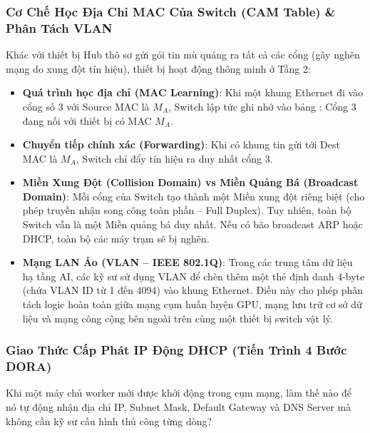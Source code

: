 \subsubsection{Cơ Chế Học Địa Chỉ MAC Của Switch (CAM Table) \& Phân Tách VLAN}
Khác với thiết bị Hub thô sơ gửi gói tin mù quáng ra tất cả các cổng (gây nghẽn mạng do xung đột tín hiệu), thiết bị  hoạt động thông minh ở Tầng 2:
\begin{itemize}
  \item \textbf{Quá trình học địa chỉ (MAC Learning)}: Khi một khung Ethernet đi vào cổng số 3 với Source MAC là $M_A$, Switch lập tức ghi nhớ vào bảng : Cổng 3 đang nối với thiết bị có MAC $M_A$.
  \item \textbf{Chuyển tiếp chính xác (Forwarding)}: Khi có khung tin gửi tới Dest MAC là $M_A$, Switch chỉ đẩy tín hiệu ra duy nhất cổng 3.
  \item \textbf{Miền Xung Đột (Collision Domain) vs Miền Quảng Bá (Broadcast Domain)}: Mỗi cổng của Switch tạo thành một Miền xung đột riêng biệt (cho phép truyền nhận song công toàn phần -- Full Duplex). Tuy nhiên, toàn bộ Switch vẫn là một Miền quảng bá duy nhất. Nếu có bão broadcast ARP hoặc DHCP, toàn bộ các máy trạm sẽ bị nghẽn.
  \item \textbf{Mạng LAN Ảo (VLAN -- IEEE 802.1Q)}: Trong các trung tâm dữ liệu hạ tầng AI, các kỹ sư sử dụng VLAN để chèn thêm một thẻ định danh 4-byte (chứa VLAN ID từ 1 đến 4094) vào khung Ethernet. Điều này cho phép phân tách logic hoàn toàn giữa mạng cụm huấn luyện GPU, mạng lưu trữ cơ sở dữ liệu và mạng công cộng bên ngoài trên cùng một thiết bị switch vật lý.
\end{itemize}

\subsubsection{Giao Thức Cấp Phát IP Động DHCP (Tiến Trình 4 Bước DORA)}
Khi một máy chủ worker mới được khởi động trong cụm mạng, làm thế nào để nó tự động nhận địa chỉ IP, Subnet Mask, Default Gateway và DNS Server mà không cần kỹ sư cấu hình thủ công từng dòng?

